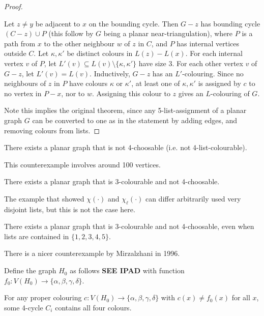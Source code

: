 \documentclass[main.tex]{subfiles}
\begin{document}
\begin{proof}
\begin{subproof}
\begin{itemize}
        Let $z\neq y$ be adjacent to $x$ on the bounding cycle.
        Then $G - z$ has bounding cycle $(C - z)\cup P$ (this follow by $G$
        being a planar near-triangulation), where $P$ is a path
        from $x$ to the other neighbour $w$ of $z$ in $C$, and $P$ has internal
        vertices outside $C$.
        Let $\kappa, \kappa'$ be distinct colours in $L(z) - L(x)$.
        For each internal vertex $v$ of $P$, let
        $L'(v)\subseteq L(v)\setminus\{\kappa,\kappa'\}$ have size 3.
        For each other vertex $v$ of $G - z$, let $L'(v) = L(v)$.
        Inductively, $G - z$ has an $L'$-colouring.
        Since no neighbours of $z$ in $P$ have colours $\kappa$ or $\kappa'$,
        at least one of $\kappa, \kappa'$ is assigned by $c$ to no vertex in
        $P - x$, nor to $w$.
        Assigning this colour to $z$ gives an $L$-colouring of $G$.
        \qedhere
    \end{itemize}
  \end{subproof}
  Note this implies the original theorem, since any 5-list-assignment of a
  planar graph $G$ can be converted to one as in the statement by adding edges,
  and removing colours from lists.
\end{proof}
\begin{theorem}[Voigt 1993]
  There exists a planar graph that is not 4-choosable (i.e. not 4-list-colourable).
\end{theorem}
This counterexample involves around 100 vertices.
\begin{theorem}[Gutner 1996]
  There exists a planar graph that is 3-colourable and not 4-choosable.
\end{theorem}
The example that showed $\chi(\cdot)$ and $\chi_\ell(\cdot)$ can differ
arbitrarily used very disjoint lists, but this is not the case here.
\begin{theorem}
  There exists a planar graph that is 3-colourable and not 4-choosable,
  even when lists are contained in $\{1,2,3,4,5\}$.
\end{theorem}
There is a nicer counterexample by Mirzalzhani in 1996.
\begin{lemma}
  Define the graph $H_0$ as follows
  \textbf{SEE IPAD}
  with function $f_0:V(H_0)\to\{\alpha,\beta,\gamma,\delta\}$.

  For any proper colouring $c:V(H_0)\to\{\alpha,\beta,\gamma,\delta\}$ with
  $c(x)\neq f_0(x)$ for all $x$, some 4-cycle $C_i$ contains all four colours.
\end{lemma}
\end{document}
